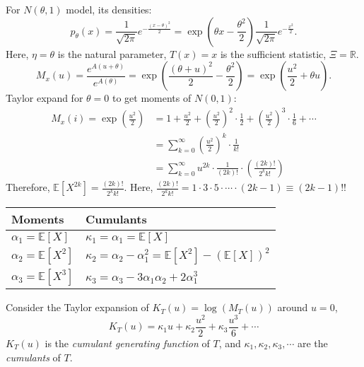 \documentclass[a4paper]{article}
\begin{document}
\begin{eg}
	For $N(\theta,1)$ model, its densities:
	\begin{equation*}
		p_\theta(x) = \frac{1}{\sqrt{2 \pi}} e^{-\frac{(x-\theta)^2}{2}} = \exp\left(\theta x - \frac{{\theta}^2}{2}\right) \frac{1}{\sqrt{2 \pi}} e^{- \frac{x^2}{2}}.
	\end{equation*}
	Here, $\eta = \theta$ is the natural parameter, $T(x) = x$ is the sufficient statistic, $\Xi = \mathbb{R}$.
	\begin{equation}
		M_x(u) = \frac{e^{A(u + \theta)}}{e^{A(\theta)}} = \exp\left(\frac{(\theta + u)^2}{2} - \frac{\theta^2}{2}\right) = \exp\left(\frac{u^2}{2} + \theta u\right).
	\end{equation}
	Taylor expand for $\theta = 0$ to get moments of $N(0,1)$:
	\begin{equation}
		\begin{aligned}
			M_x(i) = \exp(\frac{u^2}{2}) &= 1 + \frac{u^2}{2} + (\frac{u^2}{2})^2 \cdot \frac{1}{2} + (\frac{u^2}{2})^3 \cdot \frac{1}{6} + \cdots \\
			&= \sum\limits_{k = 0}^{\infty} \left(\frac{u^2}{2}\right)^k \cdot \frac{1}{k!} \\
			&= \sum\limits_{k = 0}^{\infty} u^{2k} \cdot \frac{1}{(2k)!} \cdot \left(\frac{(2k)!}{2^k k!}\right)
		\end{aligned}
	\end{equation}
	Therefore, $\mathbb{E}[X^{2k}] = \frac{(2k)!}{2^k k!}$. Here, $\frac{(2k)!}{2^k k!} = 1 \cdot 3 \cdot 5 \cdot \cdots \cdot (2k-1) \equiv (2k-1)!!$
\end{eg}

\begin{center}
	\begin{tabular}{l | l}
		\toprule
		Moments & Cumulants \\
		\midrule
		$\alpha_1 = \mathbb{E}[X]$ & $\kappa_1 = \alpha_1 = \mathbb{E}[X]$ \\
		$\alpha_2 = \mathbb{E}[X^2]$ & $\kappa_2 = \alpha_2 - \alpha_1^2 = \mathbb{E}[X^2] - (\mathbb{E}[X])^2$ \\
		$\alpha_3 = \mathbb{E}[X^3]$ & $\kappa_3 = \alpha_3 - 3 \alpha_1 \alpha_2 + 2 \alpha_1^3$ \\
		\bottomrule 
	\end{tabular}
\end{center}

\begin{defi}
	Consider the Taylor expansion of $K_T(u) = \log(M_T(u))$ around $u = 0$,
	\begin{equation}
		K_T(u) = \kappa_1u + \kappa_2 \frac{u^2}{2} + \kappa_3\frac{u^3}{6} + \cdots
	\end{equation}
	$K_T(u)$ is the \emph{cumulant generating function} of $T$, and $\kappa_1, \kappa_2, \kappa_3, \cdots$ are the \emph{cumulants} of $T$.
\end{defi}
\end{document}
